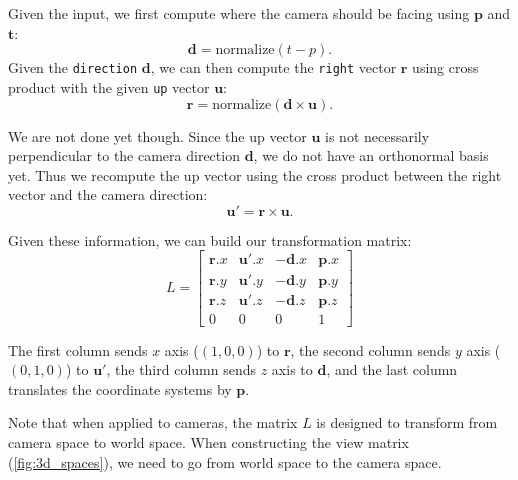 Given the input, we first compute where the camera should be facing using $\mathbf{p}$ and $\mathbf{t}$:
\begin{equation}
\mathbf{d} = \text{normalize}(t - p).
\end{equation} 
Given the \lstinline{direction} $\mathbf{d}$, we can then compute the \lstinline{right} vector $\mathbf{r}$ using cross product with the given \lstinline{up} vector $\mathbf{u}$:
\begin{equation}
\mathbf{r} = \text{normalize}\left(\mathbf{d} \times \mathbf{u}\right).
\end{equation}

We are not done yet though. Since the up vector $\mathbf{u}$ is not necessarily perpendicular to the camera direction $\mathbf{d}$, we do not have an orthonormal basis yet. Thus we recompute the up vector using the cross product between the right vector and the camera direction:
\begin{equation}
\mathbf{u}' = \mathbf{r} \times \mathbf{u}.
\end{equation}

Given these information, we can build our transformation matrix:
\begin{equation}
L = 
\begin{bmatrix}
\mathbf{r}.x & \mathbf{u}'.x & -\mathbf{d}.x & \mathbf{p}.x \\
\mathbf{r}.y & \mathbf{u}'.y & -\mathbf{d}.y & \mathbf{p}.y \\
\mathbf{r}.z & \mathbf{u}'.z & -\mathbf{d}.z & \mathbf{p}.z \\
0 & 0 & 0 & 1 
\end{bmatrix}
\end{equation}

The first column sends $x$ axis ($(1, 0, 0)$) to $\mathbf{r}$, the second column sends $y$ axis ($(0, 1, 0)$) to $\mathbf{u}'$, the third column sends $z$ axis to $\mathbf{d}$, and the last column translates the coordinate systems by $\mathbf{p}$.

Note that when applied to cameras, the matrix $L$ is designed to transform from camera space to world space. When constructing the view matrix (\cref{fig:3d_spaces}), we need to go from world space to the camera space. 


